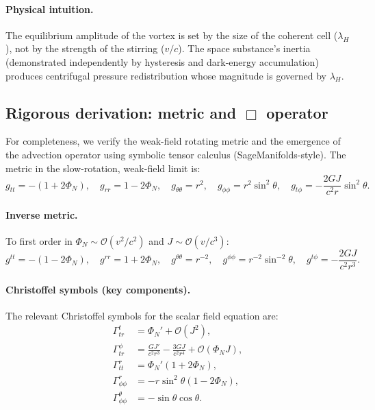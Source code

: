 \documentclass[11pt]{article}
\begin{document}
\paragraph{Physical intuition.}
The equilibrium amplitude of the vortex is set by the size of the
coherent cell ($\lambda_H$), not by the strength of the stirring
($v/c$).  The space substance's inertia (demonstrated independently
by hysteresis and dark-energy accumulation) produces centrifugal
pressure redistribution whose magnitude is governed by $\lambda_H$.

\subsection[Rigorous derivation: metric and Box operator]{Rigorous derivation: metric and $\Box$ operator}

For completeness, we verify the weak-field rotating metric and the emergence of the advection operator using symbolic tensor calculus (SageManifolds-style). The metric in the slow-rotation, weak-field limit is:
\begin{equation}
g_{tt} = -(1+2\Phi_N), \quad g_{rr} = 1-2\Phi_N, \quad g_{\theta\theta} = r^2, \quad g_{\phi\phi} = r^2\sin^2\theta, \quad g_{t\phi} = -\frac{2GJ}{c^2r}\sin^2\theta.
\label{eq:metric_components}
\end{equation}

\paragraph{Inverse metric.}
To first order in $\Phi_N \sim \mathcal{O}(v^2/c^2)$ and $J \sim \mathcal{O}(v/c^3)$:
\begin{equation}
g^{tt} = -(1-2\Phi_N), \quad g^{rr} = 1+2\Phi_N, \quad g^{\theta\theta} = r^{-2}, \quad g^{\phi\phi} = r^{-2}\sin^{-2}\theta, \quad g^{t\phi} = -\frac{2GJ}{c^2r^3}.
\label{eq:inverse_metric}
\end{equation}

\paragraph{Christoffel symbols (key components).}
The relevant Christoffel symbols for the scalar field equation are:
\begin{align}
\Gamma^t_{tr} &= \Phi_N' + \mathcal{O}(J^2), \\
\Gamma^\phi_{tr} &= \frac{GJ'}{c^2r^3} - \frac{3GJ}{c^2r^4} + \mathcal{O}(\Phi_N J), \\
\Gamma^r_{tt} &= \Phi_N'(1+2\Phi_N), \\
\Gamma^r_{\phi\phi} &= -r\sin^2\theta(1-2\Phi_N), \\
\Gamma^\theta_{\phi\phi} &= -\sin\theta\cos\theta.
\label{eq:christoffel}
\end{align}
\end{document}
